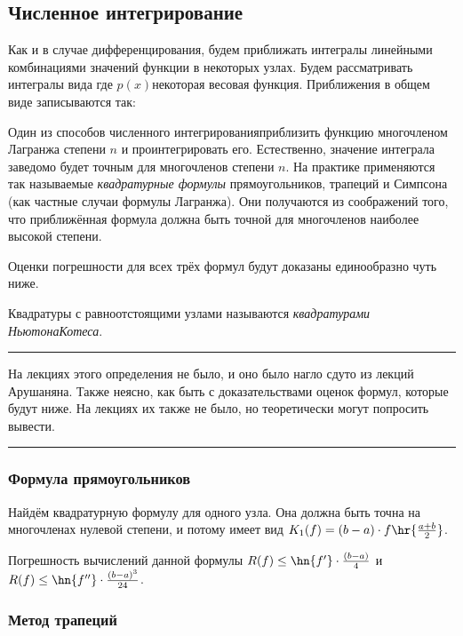 \documentclass[a4paper]{article}
\newcommand{\dx}{\,dx}
\newenvironment{petit}{\medskip\hrule\smallskip\footnotesize}{\par\smallskip\hrule\medskip}
\begin{document}
\subsection{Численное интегрирование}

Как и в случае дифференцирования, будем приближать интегралы линейными комбинациями значений функции в некоторых узлах.
Будем рассматривать интегралы вида
\eqn{I(f) = \intl{a}{b}p(x)f(x)\dx,}
где $p(x)$\т некоторая весовая функция.
Приближения в общем виде записываются так:

Один из способов численного интегрирования\т приблизить функцию многочленом Лагранжа степени $n$ и проинтегрировать его.
Естественно, значение интеграла заведомо будет точным для многочленов степени $n$.
На практике применяются так называемые \emph{квадратурные формулы} прямоугольников, трапеций и Симпсона (как частные случаи
формулы Лагранжа). Они получаются из соображений того, что приближённая формула должна быть точной для  многочленов наиболее
высокой степени.

Оценки погрешности для всех трёх формул будут доказаны единообразно чуть ниже.

\begin{df}
Квадратуры с равноотстоящими узлами называются \emph{квадратурами Ньютона\ч Котеса}.
\end{df}

\begin{petit}
На лекциях этого определения не было, и оно было нагло сдуто из лекций Арушаняна.
Также неясно, как быть с доказательствами оценок формул, которые будут ниже. На лекциях их также не было, но теоретически
могут попросить вывести.
\end{petit}


\subsubsection{Формула прямоугольников}

Найдём квадратурную формулу для одного узла. Она должна быть точна на многочленах нулевой степени, и потому
имеет вид $K_1(f) = (b-a)\cdot f\hr{\frac{a+b}{2}}$.

Погрешность вычислений данной формулы $R(f) \le \hn{f'}\cdot \frac{(b-a)}{4}$ и $R(f) \le \hn{f''}\cdot \frac{(b-a)^3}{24}$.

\subsubsection{Метод трапеций}
\end{document}
